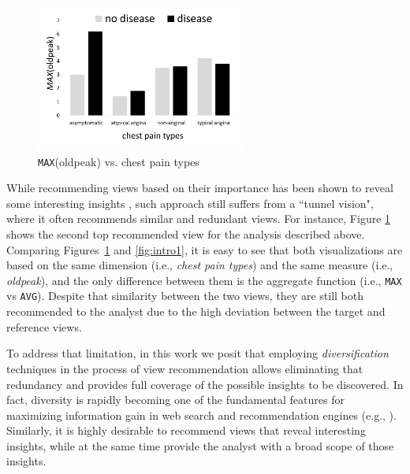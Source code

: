 \begin{figure}
	\includegraphics[width=2.7in]{figures/introduction/cp_max_oldpeak}
		\vspace{-10pt}

	\caption{ {\tt MAX}(oldpeak) vs. chest pain types}
	\label{fig:intro3}
		\vspace{-15pt}

\end{figure}


While recommending views based on their importance has been shown to reveal some interesting insights \cite{Vartak2015, Vartak2014, Ehsan2016}, such approach still suffers from  a ``tunnel vision", where it often recommends similar and redundant views. 
%
For instance, Figure \ref{fig:intro3} shows the second top recommended view for the analysis described above. 
%
Comparing Figures~\ref{fig:intro3} and \ref{fig:intro1}, it is easy to see that both visualizations are based on the same dimension (i.e., {\it chest pain types}) and the same measure (i.e., {\it oldpeak}), and the only difference between them is the aggregate function (i.e., {\tt MAX} vs {\tt AVG}). 
%
Despite that similarity between the two views, they are still both recommended to the analyst due to the high deviation between the target and reference views.



To address that limitation, in this work we posit that employing {\em diversification} techniques in the process of view recommendation allows eliminating that redundancy and provides full coverage of the possible insights to be discovered. 
%
In fact, diversity is rapidly becoming one of the fundamental features for maximizing information gain in web search and recommendation engines (e.g., \cite{Zhang2008,Clarke2008,Rafiei2010, Yu2009}). 
%
Similarly, it is highly desirable to recommend views that reveal interesting insights, while at the same time provide the analyst with a broad scope of those insights.



